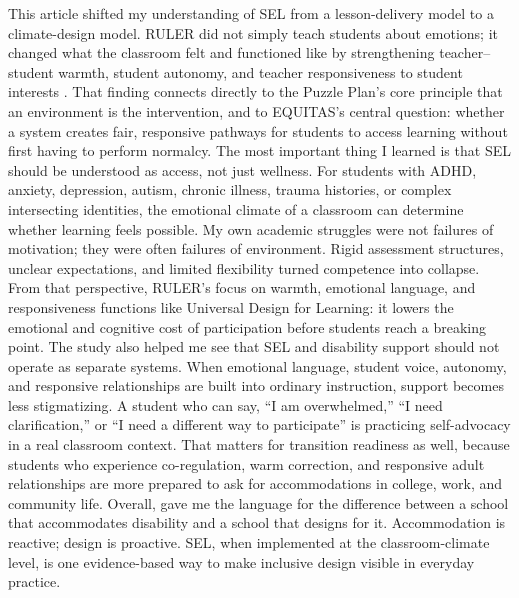 \documentclass[11pt]{article}
\newcommand{\reviewsection}[1]{\vspace{0.07in}\noindent{\normalsize\bfseries\color{PrimaryRed}#1}\par\vspace{0.02in}}
\begin{document}
\reviewsection{What I Learned and Why It Matters}
This article shifted my understanding of SEL from a lesson-delivery model to a climate-design model. RULER did not simply teach students about emotions; it changed what the classroom felt and functioned like by strengthening teacher--student warmth, student autonomy, and teacher responsiveness to student interests \citep{rivers2013ruler}. That finding connects directly to the Puzzle Plan's core principle that an environment is the intervention, and to EQUITAS's central question: whether a system creates fair, responsive pathways for students to access learning without first having to perform normalcy. The most important thing I learned is that SEL should be understood as access, not just wellness. For students with ADHD, anxiety, depression, autism, chronic illness, trauma histories, or complex intersecting identities, the emotional climate of a classroom can determine whether learning feels possible. My own academic struggles were not failures of motivation; they were often failures of environment. Rigid assessment structures, unclear expectations, and limited flexibility turned competence into collapse. From that perspective, RULER's focus on warmth, emotional language, and responsiveness functions like Universal Design for Learning: it lowers the emotional and cognitive cost of participation before students reach a breaking point. The study also helped me see that SEL and disability support should not operate as separate systems. When emotional language, student voice, autonomy, and responsive relationships are built into ordinary instruction, support becomes less stigmatizing. A student who can say, ``I am overwhelmed,'' ``I need clarification,'' or ``I need a different way to participate'' is practicing self-advocacy in a real classroom context. That matters for transition readiness as well, because students who experience co-regulation, warm correction, and responsive adult relationships are more prepared to ask for accommodations in college, work, and community life. Overall, \citet{rivers2013ruler} gave me the language for the difference between a school that accommodates disability and a school that designs for it. Accommodation is reactive; design is proactive. SEL, when implemented at the classroom-climate level, is one evidence-based way to make inclusive design visible in everyday practice.

\newpage
\small

\end{document}
